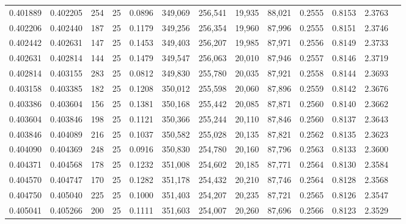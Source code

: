 \begin{tabular}{rrrrrrrrrrrrr}
0.401889 & 0.402205 &   254 &  25 &                                     0.0896 & 349,069 & 256,541 &  19,935 &  88,021 & 0.2555 & 0.8153 & 2.3763 \\
0.402206 & 0.402440 &   187 &  25 &                                     0.1179 & 349,256 & 256,354 &  19,960 &  87,996 & 0.2555 & 0.8151 & 2.3746 \\
0.402442 & 0.402631 &   147 &  25 &                                     0.1453 & 349,403 & 256,207 &  19,985 &  87,971 & 0.2556 & 0.8149 & 2.3733 \\
0.402631 & 0.402814 &   144 &  25 &                                     0.1479 & 349,547 & 256,063 &  20,010 &  87,946 & 0.2557 & 0.8146 & 2.3719 \\
0.402814 & 0.403155 &   283 &  25 &                                     0.0812 & 349,830 & 255,780 &  20,035 &  87,921 & 0.2558 & 0.8144 & 2.3693 \\
0.403158 & 0.403385 &   182 &  25 &                                     0.1208 & 350,012 & 255,598 &  20,060 &  87,896 & 0.2559 & 0.8142 & 2.3676 \\
0.403386 & 0.403604 &   156 &  25 &                                     0.1381 & 350,168 & 255,442 &  20,085 &  87,871 & 0.2560 & 0.8140 & 2.3662 \\
0.403604 & 0.403846 &   198 &  25 &                                     0.1121 & 350,366 & 255,244 &  20,110 &  87,846 & 0.2560 & 0.8137 & 2.3643 \\
0.403846 & 0.404089 &   216 &  25 &                                     0.1037 & 350,582 & 255,028 &  20,135 &  87,821 & 0.2562 & 0.8135 & 2.3623 \\
0.404090 & 0.404369 &   248 &  25 &                                     0.0916 & 350,830 & 254,780 &  20,160 &  87,796 & 0.2563 & 0.8133 & 2.3600 \\
0.404371 & 0.404568 &   178 &  25 &                                     0.1232 & 351,008 & 254,602 &  20,185 &  87,771 & 0.2564 & 0.8130 & 2.3584 \\
0.404570 & 0.404747 &   170 &  25 &                                     0.1282 & 351,178 & 254,432 &  20,210 &  87,746 & 0.2564 & 0.8128 & 2.3568 \\
0.404750 & 0.405040 &   225 &  25 &                                     0.1000 & 351,403 & 254,207 &  20,235 &  87,721 & 0.2565 & 0.8126 & 2.3547 \\
0.405041 & 0.405266 &   200 &  25 &                                     0.1111 & 351,603 & 254,007 &  20,260 &  87,696 & 0.2566 & 0.8123 & 2.3529 \\

\end{tabular}
